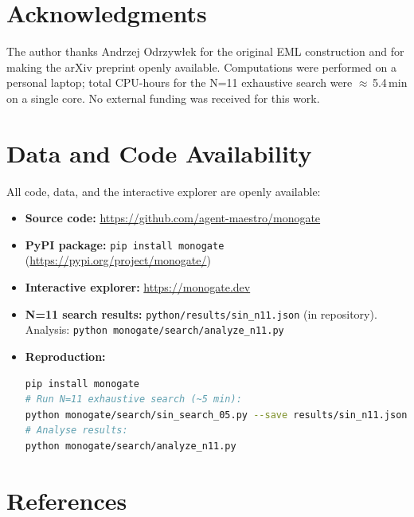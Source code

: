 \documentclass[11pt,a4paper]{article}
\begin{document}
\section*{Acknowledgments}

The author thanks Andrzej Odrzyw\l{}ek for the original EML construction
and for making the arXiv preprint openly available.
Computations were performed on a personal laptop; total CPU-hours for
the N=11 exhaustive search were $\approx$\,5.4\,min on a single core.
No external funding was received for this work.

\section*{Data and Code Availability}

All code, data, and the interactive explorer are openly available:

\begin{itemize}
  \item \textbf{Source code:} \url{https://github.com/agent-maestro/monogate}
  \item \textbf{PyPI package:} \texttt{pip install monogate}
    (\url{https://pypi.org/project/monogate/})
  \item \textbf{Interactive explorer:} \url{https://monogate.dev}
  \item \textbf{N=11 search results:}
    \texttt{python/results/sin\_n11.json} (in repository).
    Analysis: \texttt{python monogate/search/analyze\_n11.py}
  \item \textbf{Reproduction:}
\begin{lstlisting}[language=bash]
pip install monogate
# Run N=11 exhaustive search (~5 min):
python monogate/search/sin_search_05.py --save results/sin_n11.json
# Analyse results:
python monogate/search/analyze_n11.py
\end{lstlisting}
\end{itemize}

\section*{References}
\end{document}
